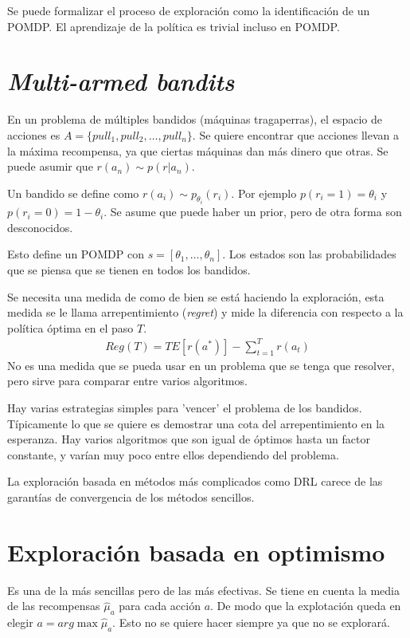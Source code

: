 Se puede formalizar el proceso de exploración como la identificación de un POMDP. El
aprendizaje de la política es trivial incluso en POMDP. 

\section{\textit{Multi-armed bandits}}%
\label{sec:multi-armed bandits}

En un problema de múltiples bandidos (máquinas tragaperras), el espacio de acciones es
$A=\{pull_1, pull_2,\ldots,pull_n\}$. Se quiere encontrar que acciones llevan a la máxima
recompensa, ya que ciertas máquinas dan más dinero que otras. Se puede asumir que
$r(a_n)\sim p(r|a_n)$. 

Un bandido se define como $r(a_i)\sim p_{\theta_i}(r_i)$. Por ejemplo  $p(r_i=1)=\theta_i$
y  $p(r_i=0)=1-\theta_i$. Se asume que puede haber un prior, pero de otra forma son
desconocidos.

Esto define un POMDP con  $s=[\theta_1,\ldots,\theta_n]$. Los estados son las probabilidades
que se piensa que se tienen en todos los bandidos. 

Se necesita una medida de como de bien se está haciendo la exploración, esta medida se le llama
arrepentimiento (\textit{regret}) y mide la diferencia con respecto a la política óptima en
el paso $T$.
\begin{align}
    Reg(T)=TE[r(a^*)]-\sum_{t=1}^T r(a_t)
\end{align}
No es una medida que se pueda usar en un problema que se tenga que resolver, pero sirve para
comparar entre varios algoritmos.

Hay varias estrategias simples para 'vencer' el problema de los bandidos. Típicamente lo que
se quiere es demostrar una cota del arrepentimiento en la esperanza. Hay varios algoritmos
que son igual de óptimos hasta un factor constante, y varían muy poco entre ellos dependiendo
del problema. 

La exploración basada en métodos más complicados como DRL carece de las garantías de
convergencia de los métodos sencillos.

\section{Exploración basada en optimismo}%
\label{sec:exploración_basada_en_optimismo}

Es una de la más sencillas pero de las más efectivas. Se tiene en cuenta la media de las
recompensas $\hat{\mu}_a$ para cada acción $a$. De modo que la explotación queda en elegir
$a=arg\max \hat{\mu}_a$. Esto no se quiere hacer siempre ya que no se explorará.


